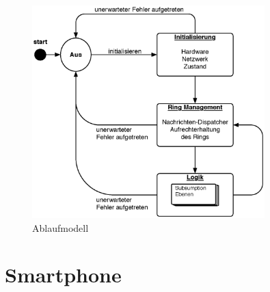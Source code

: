 \documentclass[10pt,a4paper]{article}
\let\oldsection\section
\renewcommand{\section}{\newpage \oldsection}
\begin{document}
				
		\begin{figure}[h]
			\centering
			\includegraphics[width=9cm]{images/e-puck.eps}
  			\caption{Ablaufmodell}
  		\end{figure}
			
		\section{Smartphone}
\end{document}
